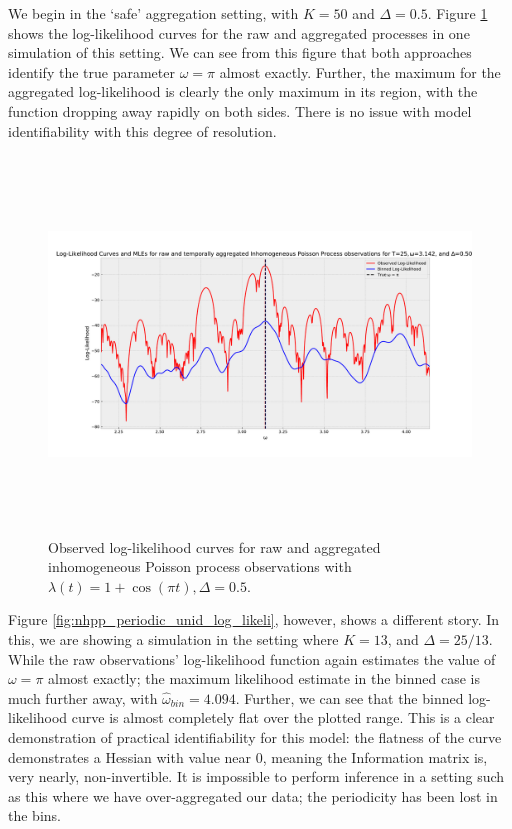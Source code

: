 \documentclass[11pt,a4,twosided,singlespacing,titlepagenumber=on,numbers=endperiod]{scrreprt}
\numberwithin{equation}{chapter} %
\theoremstyle{remark}
\begin{document}
\newpage\noindent
We begin in the `safe' aggregation setting, with $K=50$ and $\Delta=0.5$. Figure \ref{fig:nhpp_periodic_id_log_likeli} shows the log-likelihood curves for the raw and aggregated processes in one simulation of this setting. We can see from this figure that both approaches identify the true parameter $\omega = \pi$ almost exactly. Further, the maximum for the aggregated log-likelihood is clearly the only maximum in its region, with the function dropping away rapidly on both sides. There is no issue with model identifiability with this degree of resolution.
\begin{figure}[!h]
	\includegraphics[height=10cm, width=16cm]{nhpp_periodic_id_log_likeli.pdf}
	\centering
	\caption{Observed log-likelihood curves for raw and aggregated inhomogeneous Poisson process observations with $\lambda(t)= 1 + \cos(\pi t), \Delta=0.5$.}
	\label{fig:nhpp_periodic_id_log_likeli}
\end{figure}
\newpage\noindent
Figure \ref{fig:nhpp_periodic_unid_log_likeli}, however, shows a different story. In this, we are showing a simulation in the setting where $K=13$, and $\Delta=25/13$. While the raw observations' log-likelihood function again estimates the value of $\omega=\pi$ almost exactly; the maximum likelihood estimate in the binned case is much further away, with $\hat{\omega}_{bin} = 4.094$. Further, we can see that the binned log-likelihood curve is almost completely flat over the plotted range. This is a clear demonstration of practical identifiability for this model: the flatness of the curve demonstrates a Hessian with value near 0, meaning the Information matrix is, very nearly, non-invertible. It is impossible to perform inference in a setting such as this where we have over-aggregated our data; the periodicity has been lost in the bins.
\end{document}
